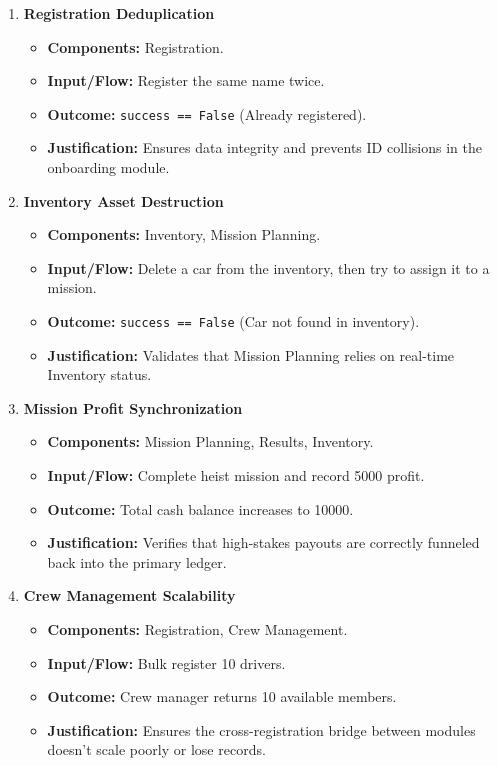 \documentclass{article}
\begin{document}
\begin{enumerate}
    \item \textbf{Registration Deduplication}
    \begin{itemize}
        \item \textbf{Components:} Registration.
        \item \textbf{Input/Flow:} Register the same name twice.
        \item \textbf{Outcome:} \texttt{success == False} (Already registered).
        \item \textbf{Justification:} Ensures data integrity and prevents ID collisions in the onboarding module.
    \end{itemize}

    \item \textbf{Inventory Asset Destruction}
    \begin{itemize}
        \item \textbf{Components:} Inventory, Mission Planning.
        \item \textbf{Input/Flow:} Delete a car from the inventory, then try to assign it to a mission.
        \item \textbf{Outcome:} \texttt{success == False} (Car not found in inventory).
        \item \textbf{Justification:} Validates that Mission Planning relies on real-time Inventory status.
    \end{itemize}

    \item \textbf{Mission Profit Synchronization}
    \begin{itemize}
        \item \textbf{Components:} Mission Planning, Results, Inventory.
        \item \textbf{Input/Flow:} Complete heist mission and record 5000 profit.
        \item \textbf{Outcome:} Total cash balance increases to 10000.
        \item \textbf{Justification:} Verifies that high-stakes payouts are correctly funneled back into the primary ledger.
    \end{itemize}

    \item \textbf{Crew Management Scalability}
    \begin{itemize}
        \item \textbf{Components:} Registration, Crew Management.
        \item \textbf{Input/Flow:} Bulk register 10 drivers.
        \item \textbf{Outcome:} Crew manager returns 10 available members.
        \item \textbf{Justification:} Ensures the cross-registration bridge between modules doesn't scale poorly or lose records.
    \end{itemize}


\end{enumerate}
\end{document}
